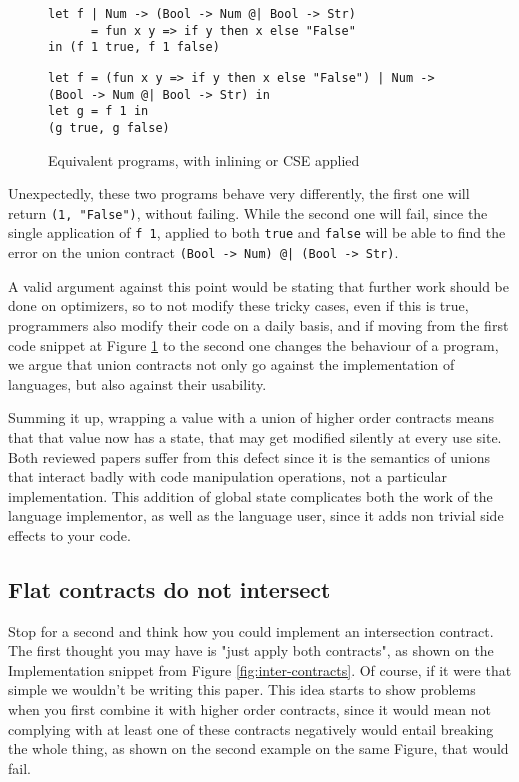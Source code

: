 \documentclass[sigplan,10pt,review,anonymous]{acmart}
\newcommand{\nickel}[1]{\lstinline[language=nickel]{#1}}
\begin{document}
\begin{figure}[h]
\begin{lstlisting}[language=nickel, title=Inlined]
let f | Num -> (Bool -> Num @| Bool -> Str)
      = fun x y => if y then x else "False"
in (f 1 true, f 1 false)
\end{lstlisting}
\begin{lstlisting}[language=nickel, title=Common Subexpression Eliminated]
let f = (fun x y => if y then x else "False") | Num -> (Bool -> Num @| Bool -> Str) in
let g = f 1 in
(g true, g false)
\end{lstlisting}
\caption{Equivalent programs, with inlining or CSE applied}
\label{fig:optimized-programs}
\end{figure}

Unexpectedly, these two programs behave very differently, the first one will
return \nickel{(1, "False")}, without failing.  While the second one will fail,
since the single application of \nickel{f 1}, applied to both \nickel{true} and
\nickel{false} will be able to find the error on the union contract
\nickel{(Bool -> Num) @| (Bool -> Str)}.

A valid argument against this point would be stating that further work should be done
on optimizers, so to not modify these tricky cases, even if this is true,
programmers also modify their code on a daily basis, and if moving from the first
code snippet at Figure \ref{fig:optimized-programs} to the second one changes
the behaviour of a program, we argue that union contracts not only go against the
implementation of languages, but also against their usability.

Summing it up, wrapping a value with a union of higher order contracts means that
that value now has a state, that may get modified silently at every use site.
Both reviewed papers suffer from this defect since it is the semantics
of unions that interact badly with code manipulation operations,
not a particular implementation.
This addition of global state complicates both the work of the language
implementor, as well as the language user, since it adds non trivial
side effects to your code.


\subsection*{Flat contracts do not intersect}
\label{sec:flat-and-inter}

Stop for a second and think how you could implement an intersection
contract. The first thought you may have is "just apply
both contracts", as shown on the Implementation snippet
from Figure \ref{fig:inter-contracts}.
Of course, if it were that simple we wouldn't be writing this paper.
This idea starts to show problems when you first combine it with
higher order contracts, since it would mean not complying with
at least one of these contracts negatively would entail breaking the
whole thing, as shown on the second example on the same Figure,
that would fail.
\end{document}
